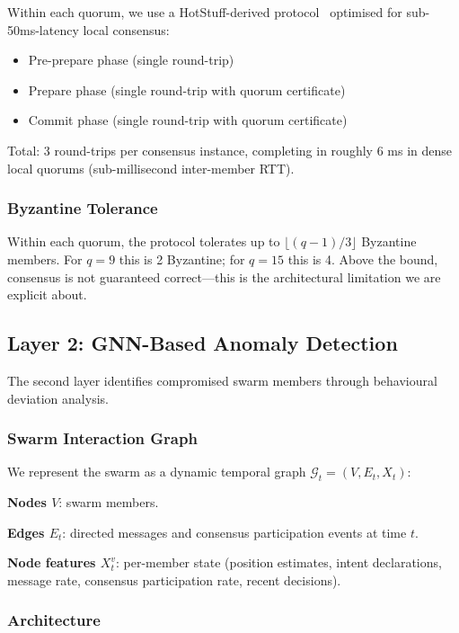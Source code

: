 \documentclass[sigconf,nonacm]{acmart}
\begin{document}
Within each quorum, we use a HotStuff-derived
protocol~\cite{yin2019hotstuff} optimised for
sub-50ms-latency local consensus:

\begin{itemize}
  \item Pre-prepare phase (single round-trip)
  \item Prepare phase (single round-trip with quorum certificate)
  \item Commit phase (single round-trip with quorum certificate)
\end{itemize}

Total: 3 round-trips per consensus instance, completing in
roughly 6 ms in dense local quorums (sub-millisecond
inter-member RTT).

\subsubsection{Byzantine Tolerance}

Within each quorum, the protocol tolerates up to $\lfloor
(q-1)/3 \rfloor$ Byzantine members. For $q = 9$ this is 2
Byzantine; for $q = 15$ this is 4. Above the bound, consensus
is not guaranteed correct---this is the architectural
limitation we are explicit about.

\subsection{Layer 2: GNN-Based Anomaly Detection}

The second layer identifies compromised swarm members through
behavioural deviation analysis.

\subsubsection{Swarm Interaction Graph}

We represent the swarm as a dynamic temporal graph $\mathcal{G}_t
= (V, E_t, X_t)$:

\textbf{Nodes $V$}: swarm members.

\textbf{Edges $E_t$}: directed messages and consensus
participation events at time $t$.

\textbf{Node features $X_t^v$}: per-member state (position
estimates, intent declarations, message rate, consensus
participation rate, recent decisions).

\subsubsection{Architecture}
\end{document}
